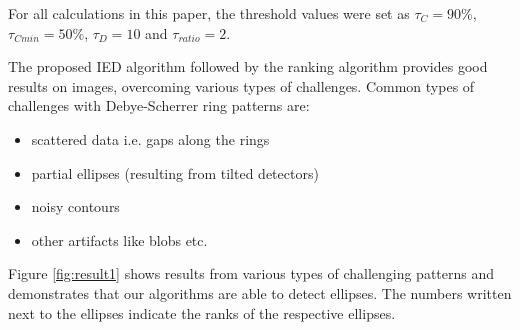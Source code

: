 \documentclass[preprint]{iucr}              %
\newcommand\dsr{Debye-Scherrer ring}
\begin{document}
For all calculations in this paper, the threshold values were set as
${\tau}_C=90\%$, ${\tau}_{Cmin}=50\%$, ${\tau}_D=10$ and ${\tau}_{ratio}=2$. 

The proposed IED algorithm followed by the ranking algorithm provides good
results on images, overcoming various types of challenges. 
Common types of challenges with {\dsr} patterns are:

\begin{itemize}
    \item scattered data i.e. gaps along the rings
    \item partial ellipses (resulting from tilted detectors)
    \item noisy contours
    \item other artifacts like blobs etc.
\end{itemize}

Figure \ref{fig:result1} shows results from various types of challenging
patterns and demonstrates that our algorithms are able to detect ellipses. 
The numbers written next to the ellipses indicate the ranks of the respective
ellipses. 
\end{document}
